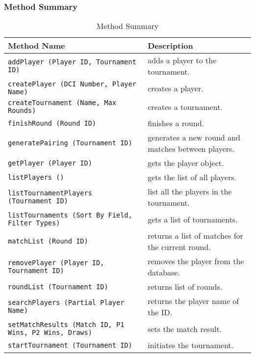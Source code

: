 \documentclass[11pt]{article}
\begin{document}
    \subsubsection{Method Summary}
    \begin{table*}[h]
        \centering
        \begin{tabulary}{0.9\textwidth}{|p{28em}|p{17em}|}
            \hline
            \textbf{Method Name} & \textbf{Description}\\
            \hline
            \texttt{addPlayer (Player ID, Tournament ID)} & adds a player to the tournament.\\
            \hline
            \texttt{createPlayer (DCI Number, Player Name)} & creates a player.\\
            \hline
            \texttt{createTournament (Name, Max Rounds)} & creates a tournament.\\
            \hline
            \texttt{finishRound (Round ID)} & finishes a round.\\
            \hline
            \texttt{generatePairing (Tournament ID)} & generates a new round and matches between players.\\
            \hline
            \texttt{getPlayer (Player ID)} & gets the player object.\\
            \hline
            \texttt{listPlayers ()} & gets the list of all players.\\
            \hline
            \texttt{listTournamentPlayers (Tournament ID)} & list all the players in the tournament.\\
            \hline
            \texttt{listTournaments (Sort By Field, Filter Types)} & gets a list of tournaments.\\
            \hline
            \texttt{matchList (Round ID)} & returns a list of matches for the current round.\\
            \hline
            \texttt{removePlayer (Player ID, Tournament ID)} & removes the player from the database.\\
            \hline
            \texttt{roundList (Tournament ID)} & returns list of rounds.\\
            \hline
            \texttt{searchPlayers (Partial Player Name)} & returns the player name of the ID.\\
            \hline
            \texttt{setMatchResults (Match ID, P1 Wins, P2 Wins, Draws)} & sets the match result.\\
            \hline
            \texttt{startTournament (Tournament ID)} & initiates the tournament.\\
            \hline
        \end{tabulary}
        \caption{Method Summary}
    \end{table*}
    \newpage
    
\end{document}
